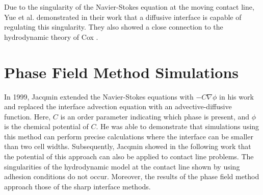 Due to the singularity of the Navier-Stokes equation at the moving contact line, Yue et al. \cite{yue2010SharpinterfaceLimitCahn} demonstrated in their work that a diffusive interface is capable of regulating this singularity. They also showed a close connection to the hydrodynamic theory of Cox \cite{cox1986DynamicsSpreadingLiquids}.

\section{Phase Field Method Simulations}

In 1999, Jacqmin \cite{jacqmin1999CalculationTwoPhaseNavier} extended the Navier-Stokes equations with \(-C\nabla \phi\) in his work and replaced the interface advection equation with an advective-diffusive function. Here, \(C\) is an order parameter indicating which phase is present, and \(\phi\) is the chemical potential of \(C\). He was able to demonstrate that simulations using this method can perform precise calculations where the interface can be smaller than two cell widths. Subsequently, Jacqmin showed in the following work \cite{jacqmin2000ContactlineDynamicsDiffuse} that the potential of this approach can also be applied to contact line problems. The singularities of the hydrodynamic model at the contact line shown by  using adhesion conditions do not occur. Moreover, the results of the phase field method approach those of the sharp interface methods.